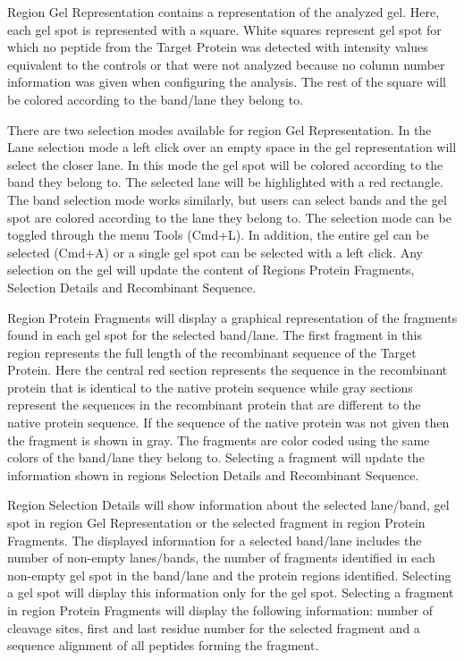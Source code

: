 Region Gel Representation contains a representation of the analyzed gel. Here, each
gel spot is represented with a square. White squares represent gel spot for which
no peptide from the Target Protein was detected with intensity values equivalent
to the controls or that were not analyzed because no column number information was
given when configuring the analysis. The rest of the square will be colored according
to the band/lane they belong to.

There are two selection modes available for region Gel Representation. In the Lane
selection mode a left click over an empty space in the gel representation will select
the closer lane. In this mode the gel spot will be colored according to the band
they belong to. The selected lane will be highlighted with a red rectangle. The band
selection mode works similarly, but users can select bands and the gel spot are colored
according to the lane they belong to. The selection mode can be toggled through
the menu Tools (Cmd+L). In addition, the entire gel can be
selected (Cmd+A) or a single gel spot can be selected with a left click. Any selection
on the gel will update the content of Regions Protein Fragments, Selection Details
and Recombinant Sequence.

Region Protein Fragments will display a graphical representation of the fragments
found in each gel spot for the selected band/lane. The first fragment in this region
represents the full length of the recombinant sequence of the Target Protein. Here
the central red section represents the sequence in the recombinant protein that is
identical to the native protein sequence while gray sections represent the sequences
in the recombinant protein that are different to the native protein sequence. If
the sequence of the native protein was not given then the fragment is shown in gray.
The fragments are color coded using the same colors of the band/lane they belong to.
Selecting a fragment will update the information shown in regions Selection Details
and Recombinant Sequence.

Region Selection Details will show information about the selected lane/band, gel
spot in region Gel Representation or the selected fragment in region Protein Fragments.
The displayed information for a selected band/lane includes the number of non-empty
lanes/bands, the number of fragments identified in each non-empty gel spot in the
band/lane and the protein regions identified. Selecting a gel spot will display this
information only for the gel spot. Selecting a fragment in region Protein Fragments
will display the following information: number of cleavage sites, first and last
residue number for the selected fragment and a sequence alignment of all peptides
forming the fragment.

